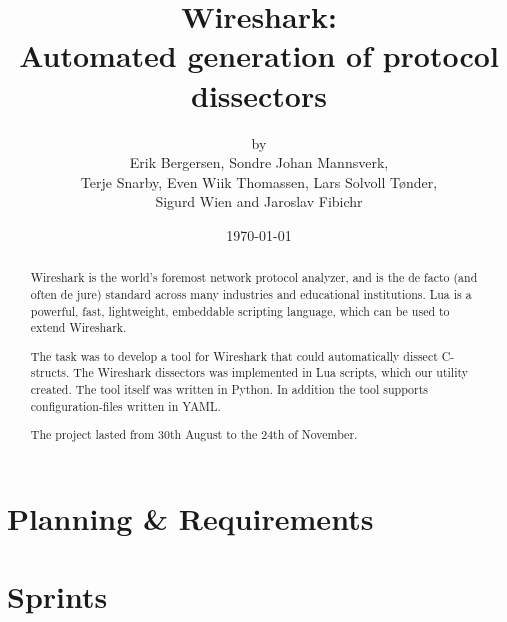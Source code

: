 \documentclass[a4paper, 11pt]{report}
\title{Wireshark:\\ Automated generation of protocol dissectors}
\author{by\\ Erik Bergersen, Sondre Johan Mannsverk,\\ Terje Snarby,
		Even Wiik Thomassen, Lars Solvoll Tønder,\\ Sigurd Wien
		and Jaroslav Fibichr}
\date{\today}
\begin{document}
\maketitle

\begin{abstract}
Wireshark is the world's foremost network protocol analyzer, and is the de
facto (and often de jure) standard across many industries and educational
institutions. Lua is a powerful, fast, lightweight, embeddable scripting
language, which can be used to extend Wireshark.



The task was to develop a tool for Wireshark that could automatically
dissect C-structs. The Wireshark dissectors was implemented in Lua scripts, 
which our utility created. The tool itself was written in Python. In addition 
the tool supports configuration-files written in YAML.

The project lasted from 30th August to the 24th of November.

\end{abstract}

\tableofcontents

\part{Planning \& Requirements}








\part{Sprints}




\end{document}
